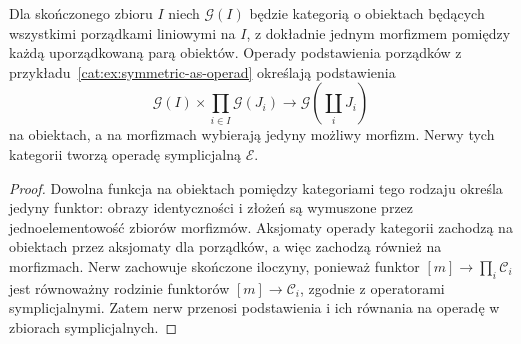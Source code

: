 \begin{przyklad}\label{cat:ex:barratt-eccles}
Dla skończonego zbioru $I$ niech $\mathcal G(I)$ będzie kategorią o obiektach będących wszystkimi porządkami liniowymi na $I$, z dokładnie jednym morfizmem pomiędzy każdą uporządkowaną parą obiektów. Operady podstawienia porządków z przykładu~\ref{cat:ex:symmetric-as-operad} określają podstawienia
\[
 \mathcal G(I)\times\prod_{i\in I}\mathcal G(J_i)
 \longrightarrow \mathcal G\left(\coprod_iJ_i\right)
\]
na obiektach, a na morfizmach wybierają jedyny możliwy morfizm. Nerwy tych kategorii tworzą operadę symplicjalną $\mathcal E$.
\end{przyklad}
\begin{proof}
Dowolna funkcja na obiektach pomiędzy kategoriami tego rodzaju określa jedyny funktor: obrazy identyczności i złożeń są wymuszone przez jednoelementowość zbiorów morfizmów. Aksjomaty operady kategorii zachodzą na obiektach przez aksjomaty dla porządków, a więc zachodzą również na morfizmach. Nerw zachowuje skończone iloczyny, ponieważ funktor $[m]\to\prod_i\mathcal C_i$ jest równoważny rodzinie funktorów $[m]\to\mathcal C_i$, zgodnie z operatorami symplicjalnymi. Zatem nerw przenosi podstawienia i ich równania na operadę w zbiorach symplicjalnych.
\end{proof}


